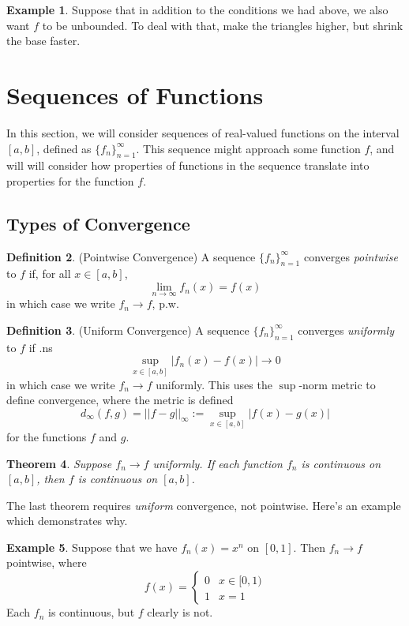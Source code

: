 \documentclass[12pt]{article}
\theoremstyle{plain}
\newtheorem{thm}{Theorem}[subsection]
\theoremstyle{definition}
\newtheorem{defn}[thm]{Definition}
\newtheorem{ex}[thm]{Example}
\theoremstyle{remark}
\begin{document}
\begin{ex}
Suppose that in addition to the conditions we had above, we also want $f$ to be unbounded. To deal with that, make the triangles higher, but shrink the base faster.
\end{ex}


\newpage
\section{Sequences of Functions}

In this section, we will consider sequences of real-valued functions on the interval $[a,b]$, defined as $\{f_n\}_{n=1}^\infty$. This sequence might approach some function $f$, and will will consider how properties of functions in the sequence translate into properties for the function $f$.

\subsection{Types of Convergence}

\begin{defn} (Pointwise Convergence) A sequence $\{f_n\}_{n=1}^\infty$ converges \emph{pointwise} to $f$ if, for all $x\in[a,b]$,
\[ 
    \lim_{n\rightarrow\infty} f_n(x) = f(x) 
\]
in which case we write $f_n\rightarrow f$, p.w.
\end{defn}

\begin{defn} (Uniform Convergence) A sequence $\{f_n\}_{n=1}^\infty$ converges \emph{uniformly} to $f$ if .ns 
\[ 
    \sup_{x\in[a,b]} |f_n(x) - f(x)| \rightarrow0 
\]
in which case we write $f_n\rightarrow f$ uniformly. This uses the $\sup$-norm metric to define convergence, where the metric is defined 
\[
    d_\infty(f,g)=||f-g||_\infty := \sup_{x\in[a,b]} |f(x)-g(x)|
\]
for the functions $f$ and $g$.
\end{defn}

\begin{thm}
Suppose $f_n\rightarrow f$ uniformly. If each function $f_n$ is continuous on $[a,b]$, then $f$ is continuous on $[a,b]$.
\end{thm}
The last theorem requires \emph{uniform} convergence, not pointwise. Here's an example which demonstrates why.
\begin{ex}
Suppose that we have $f_n(x)=x^n$ on $[0,1]$. Then $f_n\rightarrow f$ pointwise, where
    \[ f(x) = \begin{cases} 0 & x \in [0,1) \\ 1 & x=1 
\end{cases} \]
Each $f_n$ is continuous, but $f$ clearly is not.
\end{ex}
\end{document}

